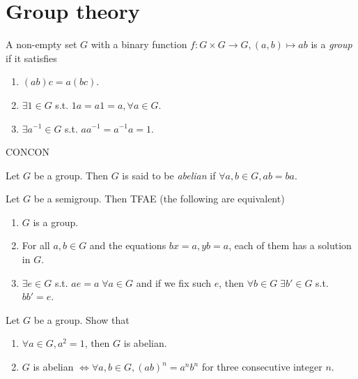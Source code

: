 \section{Group theory}

\begin{definition}
  A non-empty set $G$ with a binary function $f: G \times G \to G,
  (a, b) \mapsto ab$
  is a {\it group} if it satisfies
  \begin{enumerate}
    \item $(ab)c = a(bc)$.
    \item $\exists 1 \in G$ s.t. $1a = a1 = a, \forall a \in G$.
    \item $\exists a^{-1} \in G$ s.t. $aa^{-1} = a^{-1}a = 1$.
  \end{enumerate}
\end{definition}

CONCON

\begin{definition}
  Let $G$ be a group. Then $G$ is said to be {\it abelian} if
  $\forall a, b \in G, ab = ba$.
\end{definition}

\begin{exercise}
  Let $G$ be a semigroup. Then TFAE (the following are equivalent)
  \begin{enumerate}
    \item $G$ is a group.
    \item For all $a, b \in G$ and the equations $bx=a, yb=a$, each of them
      has a solution in $G$.
    \item $\exists e \in G$ s.t. $ae=a \; \forall a \in G$ and if we fix
      such $e$, then $\forall b \in G \; \exists b' \in G$ s.t. $bb' = e$.
  \end{enumerate}
\end{exercise}

\begin{exercise}
  Let $G$ be a group. Show that
  \begin{enumerate}
    \item $\forall a \in G, a^2 = 1$, then $G$ is abelian.
    \item $G$ is abelian $\iff \forall a, b \in G, (ab)^n = a^n b^n$ for three
      consecutive integer $n$.
  \end{enumerate}
\end{exercise}

